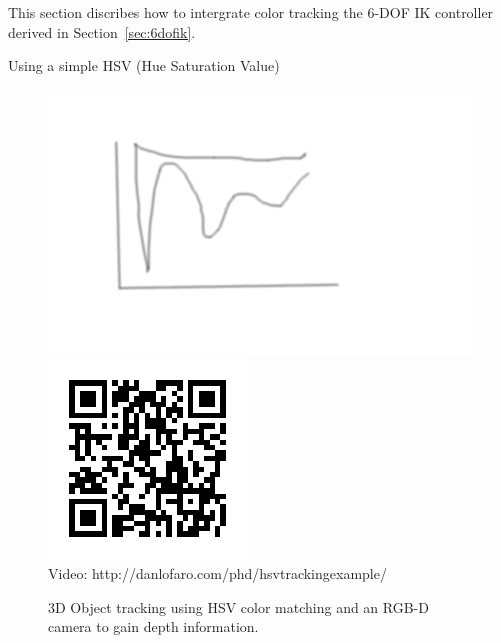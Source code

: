 This section discribes how to intergrate color tracking the 6-DOF IK controller derived in Section~\ref{sec:6dofik}.


Using a simple HSV (Hue Saturation Value) 



\begin{figure}[thpb]
  \centering
      \includegraphics[width=0.93\columnwidth]{./pix/tmp.png}
      \includegraphics{./qrcode/qrcode-hsvtrackingexample.png}\\
      Video: http://danlofaro.com/phd/hsvtrackingexample/
\caption{3D Object tracking using HSV color matching and an RGB-D camera to gain depth information.}
\label{fig:visualservoing}
\end{figure}
